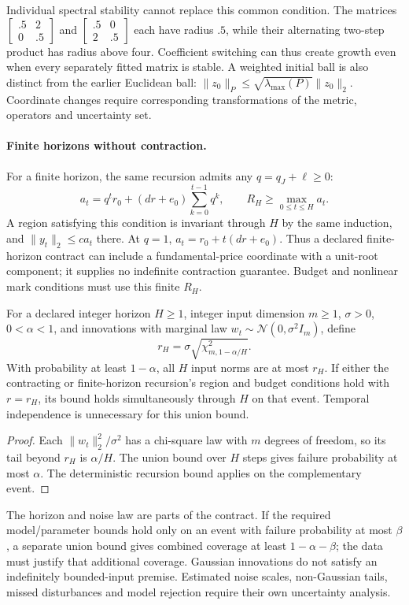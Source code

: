 Individual spectral stability cannot replace this common condition. The matrices $\left[\begin{smallmatrix}.5&2\\0&.5\end{smallmatrix}\right]$ and $\left[\begin{smallmatrix}.5&0\\2&.5\end{smallmatrix}\right]$ each have radius $.5$, while their alternating two-step product has radius above four. Coefficient switching can thus create growth even when every separately fitted matrix is stable. A weighted initial ball is also distinct from the earlier Euclidean ball: $\|z_0\|_P\le\sqrt{\lambda_{\max}(P)}\|z_0\|_2$. Coordinate changes require corresponding transformations of the metric, operators and uncertainty set.

\paragraph{Finite horizons without contraction.}
For a finite horizon, the same recursion admits any $q=q_J+\ell\ge0$:
\[
a_t=q^t r_0+(dr+e_0)\sum_{k=0}^{t-1}q^k,\qquad
R_H\ge\max_{0\le t\le H}a_t.
\]
A region satisfying this condition is invariant through $H$ by the same induction, and $\|y_t\|_2\le c a_t$ there. At $q=1$, $a_t=r_0+t(dr+e_0)$. Thus a declared finite-horizon contract can include a fundamental-price coordinate with a unit-root component; it supplies no indefinite contraction guarantee. Budget and nonlinear mark conditions must use this finite $R_H$.

\begin{proposition}
\label{prop:finite_gaussian_risk}
For a declared integer horizon $H\ge1$, integer input dimension $m\ge1$, $\sigma>0$, $0<\alpha<1$, and innovations with marginal law $w_t\sim\mathcal N(0,\sigma^2 I_m)$, define
\[
r_H=\sigma\sqrt{\chi^2_{m,1-\alpha/H}}.
\]
With probability at least $1-\alpha$, all $H$ input norms are at most $r_H$. If either the contracting or finite-horizon recursion's region and budget conditions hold with $r=r_H$, its bound holds simultaneously through $H$ on that event. Temporal independence is unnecessary for this union bound.
\end{proposition}
\begin{proof}
Each $\|w_t\|_2^2/\sigma^2$ has a chi-square law with $m$ degrees of freedom, so its tail beyond $r_H$ is $\alpha/H$. The union bound over $H$ steps gives failure probability at most $\alpha$. The deterministic recursion bound applies on the complementary event.
\end{proof}
The horizon and noise law are parts of the contract. If the required model/parameter bounds hold only on an event with failure probability at most $\beta$, a separate union bound gives combined coverage at least $1-\alpha-\beta$; the data must justify that additional coverage. Gaussian innovations do not satisfy an indefinitely bounded-input premise. Estimated noise scales, non-Gaussian tails, missed disturbances and model rejection require their own uncertainty analysis.

